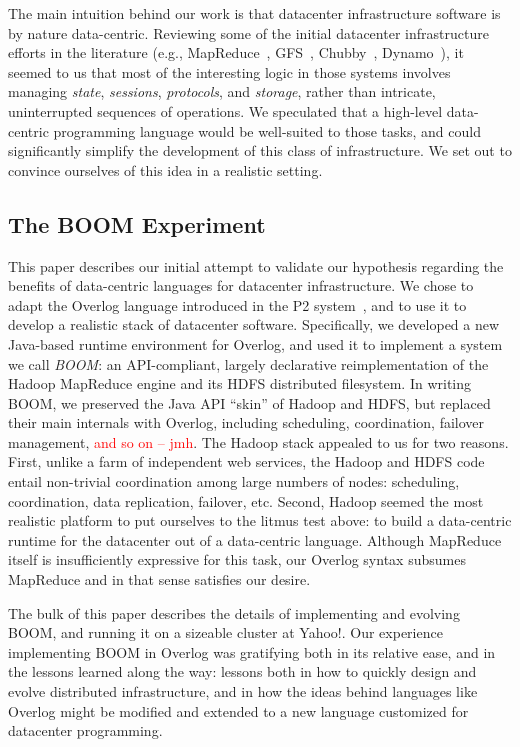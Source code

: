 \documentclass{sig-alternate}
\newcommand{\jmh}[1]{{\textcolor{red}{#1 -- jmh}}}
\begin{document}
The main intuition behind our work is that datacenter infrastructure software is by nature data-centric.  Reviewing some of the initial datacenter infrastructure efforts in the literature (e.g., MapReduce~\cite{mapreduce}, GFS~\cite{gfs}, Chubby~\cite{chubby}, Dynamo~\cite{dynamo}), it seemed to us that most of the interesting logic in those systems involves managing {\em state}, {\em sessions}, {\em protocols}, and {\em storage}, rather than intricate, uninterrupted sequences of operations.  We speculated that a high-level data-centric programming language would be well-suited to those tasks, and could significantly simplify the development of this class of infrastructure.  We set out to convince ourselves of this idea in a realistic setting.

\subsection{The BOOM Experiment}
This paper describes our initial attempt to validate our hypothesis regarding the benefits of data-centric languages for datacenter infrastructure.  We chose to adapt the Overlog language introduced in the P2 system~\cite{p2}, and to use it to develop a realistic stack of datacenter software.  Specifically, we developed a new Java-based runtime environment for Overlog, and used it to implement a system we call {\em BOOM}: an API-compliant, largely declarative reimplementation of the Hadoop MapReduce engine and its HDFS distributed filesystem.  In writing BOOM, we preserved the Java API ``skin'' of Hadoop and HDFS, but replaced their main internals with Overlog, including scheduling, coordination, failover management, \jmh{and so on}.  The Hadoop stack appealed to us for two reasons.   First, unlike a farm of independent web services, the Hadoop and HDFS code entail non-trivial coordination among large numbers of nodes:  scheduling, coordination, data replication, failover, etc.  Second, Hadoop seemed the most realistic platform to put ourselves to the litmus test above: to build a data-centric runtime for the datacenter out of a data-centric language.  Although MapReduce itself is insufficiently expressive for this task, our Overlog syntax subsumes MapReduce and in that sense satisfies our desire.

The bulk of this paper describes the details of implementing and evolving BOOM, and running it on a sizeable cluster at Yahoo!.  Our experience implementing BOOM in Overlog was gratifying both in its relative ease, and in the lessons learned along the way: lessons both in how to quickly design and evolve distributed infrastructure, and in how the ideas behind languages like Overlog might be modified and extended to a new language customized for datacenter programming.
\end{document}
